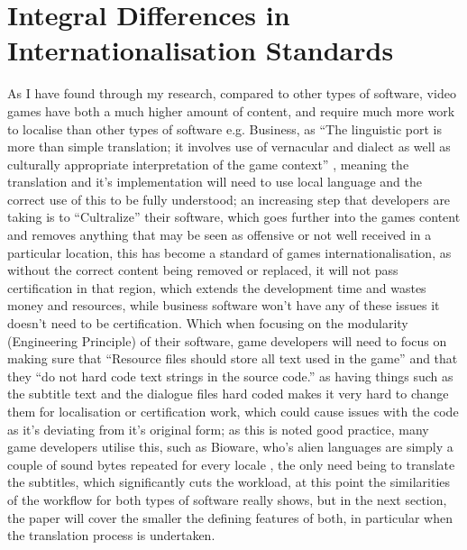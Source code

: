 \documentclass{scrartcl}
\begin{document}
\section{Integral Differences in Internationalisation Standards}
As I have found through my research, compared to other types of software, video games have both a much higher amount of content, and require much more work to localise than other types of software e.g. Business, as ``The linguistic port is more than simple translation; it involves use of vernacular and dialect as well as culturally appropriate interpretation of the game context'' \cite{losavio2014linguistic}, meaning the translation and it's implementation will need to use local language and the correct use of this to be fully understood; an increasing step that developers are taking is to ``Cultralize'' their software\cite{bestpractices}, which goes further into the games content and removes anything that may be seen as offensive or not well received in a particular location, this has become a standard of games internationalisation, as without the correct content being removed or replaced, it will not pass certification in that region, which extends the development time and wastes money and resources, while business software won't have any of these issues it doesn't need to be certification. Which when focusing on the modularity (Engineering Principle) of their software, game developers will need to focus on making sure that ``Resource files should store all text used in the game'' and that they ``do not hard code text strings in the source code.''\cite{bestpractices} as having things such as the subtitle text and the dialogue files hard coded makes it very hard to change them for localisation or certification work, which could cause issues with the code as it's deviating from it's original form; as this is noted good practice, many game developers utilise this, such as Bioware, who's alien languages are simply a couple of sound bytes repeated for every locale \cite{losavio2014linguistic}, the only need being to translate the subtitles, which significantly cuts the workload, at this point the similarities of the workflow for both types of software really shows, but in the next section, the paper will cover the smaller the defining features of both, in particular when the translation process is undertaken. 
\end{document}
